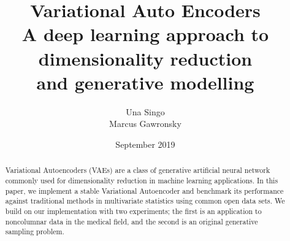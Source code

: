 \documentclass[12pt]{extarticle}
\title{Variational Auto Encoders \\  \large A deep learning approach to dimensionality reduction \\and generative modelling}
\author{Una Singo \\ Marcus Gawronsky }
\date{September 2019}
\begin{document}
\maketitle


\begin{abstract}
Variational Autoencoders (VAEs) are a class of generative artificial neural network commonly used for dimensionality reduction in machine learning applications.  In this paper, we implement a stable Variational Autoencoder and benchmark its performance against traditional methods in multivariate statistics using common open data sets. We build on our implementation with two experiments; the first is an application to noncolumnar data in the medical field, and the second is an original generative sampling problem.   
\end{abstract}




\end{document}
